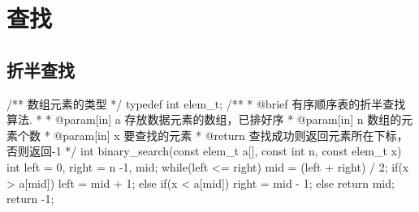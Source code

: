 \chapter{查找}

\section{折半查找} %

\begin{Codex}[label=binary_search.c]
/** 数组元素的类型 */
typedef int elem_t;
/**
  * @brief 有序顺序表的折半查找算法.
  *
  * @param[in] a 存放数据元素的数组，已排好序
  * @param[in] n 数组的元素个数
  * @param[in] x 要查找的元素
  * @return 查找成功则返回元素所在下标，否则返回-1
  */
int binary_search(const elem_t a[], const int n, const elem_t x)
{
    int left = 0, right = n -1, mid;
    while(left <= right) {
        mid = (left + right) / 2;
        if(x > a[mid]) {
            left = mid + 1;
        } else if(x < a[mid]) {
            right = mid - 1;
        } else {
            return mid;
        }
    }
    return -1;
}
\end{Codex}
